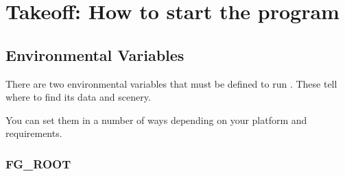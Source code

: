 
\chapter{Takeoff: How to start the program\label{takeoff}}


\section{Environmental Variables}

There are two environmental variables that must be defined to run \FlightGear{}.
These tell \FlightGear{} where to find its data and scenery.

You can set them in a number of ways depending on your platform and requirements.

\subsection{FG\_ROOT}

